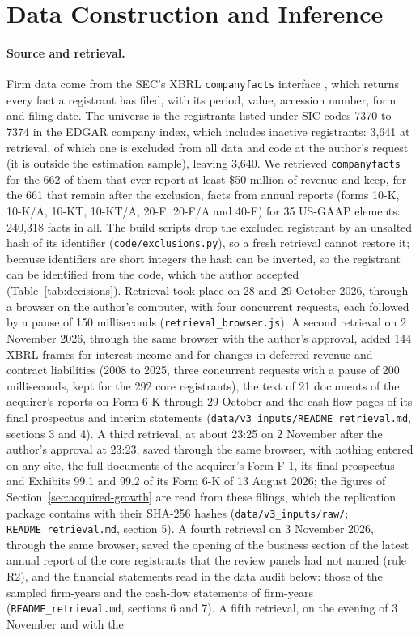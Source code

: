 \section{Data Construction and Inference}\label{app:data}

\paragraph{Source and retrieval.} Firm data come from the SEC's XBRL \texttt{companyfacts} interface \citep{sec2026xbrlapi}, which returns every fact a registrant has filed, with its period, value, accession number, form and filing date. The universe is the registrants listed under SIC codes 7370 to 7374 in the EDGAR company index, which includes inactive registrants: 3,641 at retrieval, of which one is excluded from all data and code at the author's request (it is outside the estimation sample), leaving 3,640. We retrieved \texttt{companyfacts} for the 662 of them that ever report at least \$50 million of revenue and keep, for the 661 that remain after the exclusion, facts from annual reports (forms 10-K, 10-K/A, 10-KT, 10-KT/A, 20-F, 20-F/A and 40-F) for 35 US-GAAP elements: 240,318 facts in all. The build scripts drop the excluded registrant by an unsalted hash of its identifier (\texttt{code/exclusions.py}), so a fresh retrieval cannot restore it; because identifiers are short integers the hash can be inverted, so the registrant can be identified from the code, which the author accepted (Table~\ref{tab:decisions}). Retrieval took place on 28 and 29 October 2026, through a browser on the author's computer, with four concurrent requests, each followed by a pause of 150 milliseconds (\texttt{retrieval\_browser.js}). A second retrieval on 2 November 2026, through the same browser with the author's approval, added 144 XBRL frames for interest income and for changes in deferred revenue and contract liabilities (2008 to 2025, three concurrent requests with a pause of 200 milliseconds, kept for the 292 core registrants), the text of 21 documents of the acquirer's reports on Form 6-K through 29 October and the cash-flow pages of its final prospectus and interim statements (\texttt{data/v3\_inputs/README\_retrieval.md}, sections 3 and 4). A third retrieval, at about 23:25 on 2 November after the author's approval at 23:23, saved through the same browser, with nothing entered on any site, the full documents of the acquirer's Form F-1, its final prospectus and Exhibits 99.1 and 99.2 of its Form 6-K of 13 August 2026; the figures of Section~\ref{sec:acquired-growth} are read from these filings, which the replication package contains with their SHA-256 hashes (\texttt{data/v3\_inputs/raw/}; \texttt{README\_retrieval.md}, section 5). A fourth retrieval on 3 November 2026, through the same browser, saved the opening of the business section of the latest annual report of the \VRtwoNewDesc{} core registrants that the review panels had not named (rule R2), and the financial statements read in the data audit below: those of the \AuditFirmYears{} sampled firm-years and the cash-flow statements of \CapswScanned{} firm-years (\texttt{README\_retrieval.md}, sections 6 and 7). A fifth retrieval, on the evening of 3 November and with the 